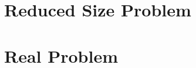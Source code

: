 \documentclass[a4paper]{article}
\begin{document}
\section{Reduced Size Problem}


\section{Real Problem}

\end{document}
